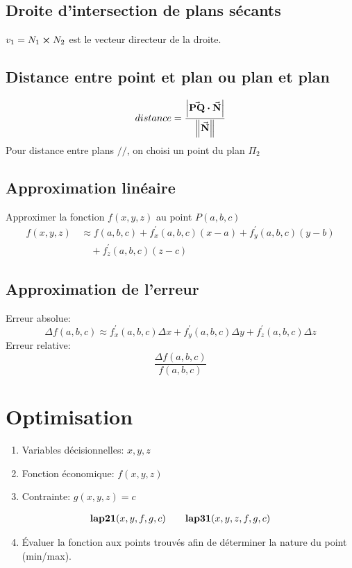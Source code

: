 \subsection{Droite d'intersection de plans sécants}
\centering
\( v_1 = N_1 \cp N_2 \) est le vecteur directeur de la droite.

\subsection{Distance entre point et plan ou plan et plan}
\raggedright
\begin{equation*}
    distance = \frac{\abs{\va{PQ}\vdot\va{N}}}{\norm{\va{N}}}
\end{equation*}
Pour distance entre plans $//$, on choisi un point du plan $\Pi_2$

\subsection{Approximation linéaire}
Approximer la fonction $f(x,y,z)$ au point $P(a,b,c)$
\begin{align*}
    f(x,y,z)\, &\approx f(a,b,c) + f^\prime_x(a,b,c)(x-a) + f^\prime_y(a,b,c)(y-b) \\ &\quad+ f^\prime_z(a,b,c)(z-c)
\end{align*}

\subsection{Approximation de l'erreur}
Erreur absolue:
\[ \Delta f(a,b,c) \approx f^\prime_x(a,b,c) \Delta x + f^\prime_y(a,b,c) \Delta y + f^\prime_z(a,b,c) \Delta z \]
Erreur relative: \[ \frac{\Delta f(a,b,c)}{f(a,b,c)}\]


\section{Optimisation}
\begin{enumerate}
    \item Variables décisionnelles: $x,y,z$
    \item Fonction économique: $f(x,y,z)$
    \item Contrainte: $g(x,y,z)=c$
\end{enumerate}%
\begin{gather*}
    \mathbf{lap21}\qty(x,y,f,g,c) \qq{} \mathbf{lap31}\qty(x,y,z,f,g,c)
\end{gather*}
\begin{enumerate}[nosep]
\setcounter{enumi}{3}
    \item Évaluer la fonction aux points trouvés afin de déterminer la nature du point (min/max).
\end{enumerate}